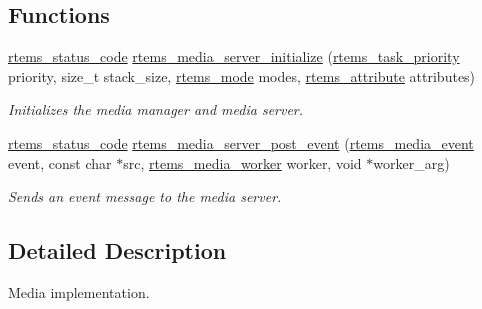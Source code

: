 \subsection*{Functions}
\begin{DoxyCompactItemize}
\item 
\mbox{\hyperlink{group__ClassicStatus_ga545d41846817eaba6143d52ee4d9e9fe}{rtems\+\_\+status\+\_\+code}} \mbox{\hyperlink{group__RTEMSIOMedia_ga5e68a64fdea7ee2ea2de20376650afda}{rtems\+\_\+media\+\_\+server\+\_\+initialize}} (\mbox{\hyperlink{group__ClassicTasks_gaa80a0c0938307d1e99d0eb5fee765b47}{rtems\+\_\+task\+\_\+priority}} priority, size\+\_\+t stack\+\_\+size, \mbox{\hyperlink{group__ClassicModes_ga8d46a41a837840dc97336fdcd20e4f68}{rtems\+\_\+mode}} modes, \mbox{\hyperlink{group__ClassicAttributes_gaea40313cf78ed843e09c4315d0a10f79}{rtems\+\_\+attribute}} attributes)
\begin{DoxyCompactList}\small\item\em Initializes the media manager and media server. \end{DoxyCompactList}\item 
\mbox{\hyperlink{group__ClassicStatus_ga545d41846817eaba6143d52ee4d9e9fe}{rtems\+\_\+status\+\_\+code}} \mbox{\hyperlink{group__RTEMSIOMedia_gabe2acca9a30bcd62765c0b1c810ba89e}{rtems\+\_\+media\+\_\+server\+\_\+post\+\_\+event}} (\mbox{\hyperlink{group__RTEMSIOMedia_gadd58c5799ee997413d4d6be2ac05197b}{rtems\+\_\+media\+\_\+event}} event, const char $\ast$src, \mbox{\hyperlink{group__RTEMSIOMedia_ga4d3df16c316c9285e61bf0f735cafdd3}{rtems\+\_\+media\+\_\+worker}} worker, void $\ast$worker\+\_\+arg)
\begin{DoxyCompactList}\small\item\em Sends an event message to the media server. \end{DoxyCompactList}\end{DoxyCompactItemize}


\subsection{Detailed Description}
Media implementation. 

